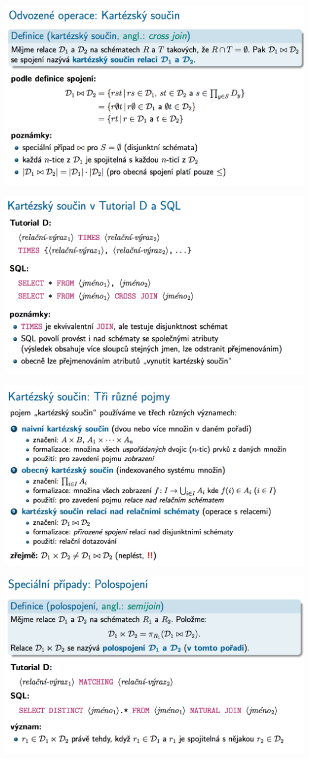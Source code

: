 \documentclass[10pt,a4paper]{article}
\begin{document}
	\includegraphics[scale=0.4]{img/43}
	
	\includegraphics[scale=0.4]{img/44}
	
	\includegraphics[scale=0.4]{img/45}
	
	\includegraphics[scale=0.4]{img/46}
	
\end{document}
